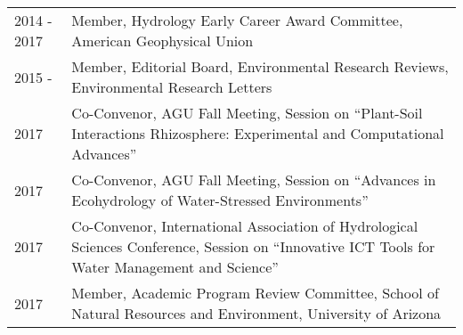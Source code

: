 
\begin{supertabular}{lp{15cm}} 
2014 - 2017 & Member, Hydrology Early Career Award Committee, American Geophysical Union \\
2015 -  & Member, Editorial Board, Environmental Research Reviews, Environmental Research Letters \\
2017 & Co-Convenor, AGU Fall Meeting, Session on ``Plant-Soil Interactions Rhizosphere: Experimental and Computational Advances'' \\
2017 & Co-Convenor, AGU Fall Meeting, Session on ``Advances in Ecohydrology of Water-Stressed Environments'' \\
2017 & Co-Convenor, International Association of Hydrological Sciences Conference, Session on ``Innovative ICT Tools for Water Management and Science'' \\
2017 & Member, Academic Program Review Committee, School of Natural Resources and Environment, University of Arizona \\
\end{supertabular}

